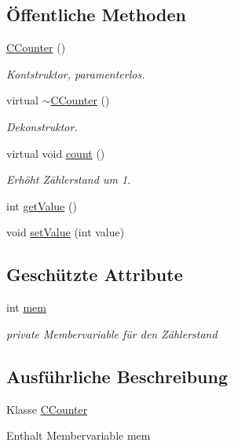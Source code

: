 \subsection*{Öffentliche Methoden}
\begin{DoxyCompactItemize}
\item 
\hyperlink{class_c_counter_ab83c6f9600beb5686747493da731a04c}{C\+Counter} ()
\begin{DoxyCompactList}\small\item\em Kontstruktor, paramenterlos. \end{DoxyCompactList}\item 
virtual \hyperlink{class_c_counter_a1af3cc000781fcd67b9e4fe1b25fbc9c}{$\sim$\+C\+Counter} ()
\begin{DoxyCompactList}\small\item\em Dekonstruktor. \end{DoxyCompactList}\item 
virtual void \hyperlink{class_c_counter_a90f3e164f3fc1dcf91044702d6940c4d}{count} ()
\begin{DoxyCompactList}\small\item\em Erhöht Zählerstand um 1. \end{DoxyCompactList}\item 
int \hyperlink{class_c_counter_a2dbc787892c9458d50a4d5ef5dcfe526}{get\+Value} ()
\item 
void \hyperlink{class_c_counter_ac41245afdd95c0149e99bad21696a372}{set\+Value} (int value)
\end{DoxyCompactItemize}
\subsection*{Geschützte Attribute}
\begin{DoxyCompactItemize}
\item 
int \hyperlink{class_c_counter_a69073a439ebaa1c748607fdf0eb8d841}{mem}
\begin{DoxyCompactList}\small\item\em private Membervariable für den Zählerstand \end{DoxyCompactList}\end{DoxyCompactItemize}


\subsection{Ausführliche Beschreibung}
Klasse \hyperlink{class_c_counter}{C\+Counter}

Enthalt Membervariable mem 

